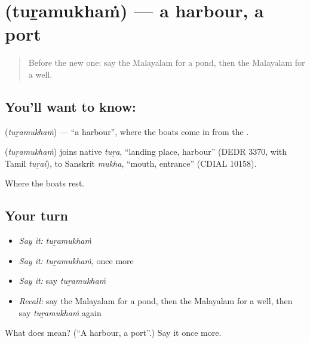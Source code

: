 \section[\texorpdfstring{\ml{തുറമുഖം} (tuṟamukhaṁ)}{തുറമുഖം (tuṟamukhaṁ)}]{ (tuṟamukhaṁ) — a harbour, a port}

\label{lesson:ML-C136-harbour}



\begin{quote}
Before the new one: say the Malayalam for a pond, then the Malayalam for a well.
\end{quote}

\subsection*{You'll want to know: }
\textbf{} (\emph{tuṟamukhaṁ}) — \textquotedblleft{}a harbour\textquotedblright{}, where the boats come in from the \textbf{}.

\begin{cousinweb}
\textbf{} (\emph{tuṟamukhaṁ}) joins native \emph{tuṟa}, \textquotedblleft{}landing place, harbour\textquotedblright{} (DEDR 3370, with Tamil \emph{tuṟai}), to Sanskrit \emph{mukha}, \textquotedblleft{}mouth, entrance\textquotedblright{} (CDIAL 10158).
\end{cousinweb}

\begin{grammarlens}[title={What you've built}]
Where the boats rest.
\end{grammarlens}

\subsection*{Your turn}
\begin{itemize}
\raggedright
  \item \emph{Say it:} \emph{tuṟamukhaṁ}
  \item \emph{Say it:} \emph{tuṟamukhaṁ}, once more
  \item \emph{Say it:} say \emph{tuṟamukhaṁ}
  \item \emph{Recall:} say the Malayalam for a pond, then the Malayalam for a well, then say \emph{tuṟamukhaṁ} again
\end{itemize}

\begin{tcolorbox}[breakable,colback=teal!4,colframe=teal!35!black,title={Before you move on}]
What does  mean? (\textquotedblleft{}A harbour, a port\textquotedblright{}.) Say it once more.
\end{tcolorbox}
